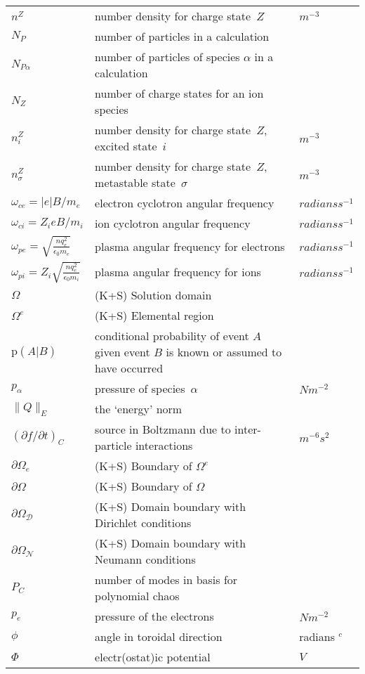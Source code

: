 \begin{longtable}{|p{3.0cm}|p{10.0cm}|p{3.0cm}|}
$n^Z$ & number density for charge state~$Z$  & $m^{-3}$ \\
$N_P$ & number of particles in a calculation & \\
$N_{P\alpha} $ & number of particles of species $\alpha$ in a calculation & \\
$N_Z$ & number of charge states for an ion species & \\
$n^Z_i$ & number density for charge state~$Z$, excited state~$i$  & $m^{-3}$ \\
$n^Z_\sigma$ & number density for charge state~$Z$, metastable state~$\sigma$  & $m^{-3}$ \\
$\omega_{ce}= |e|B/m_e$ & electron cyclotron angular frequency & $radians s^{-1}$ \\
$\omega_{ci}= Z_i e B/m_i$ & ion cyclotron angular frequency & $radians s^{-1}$ \\
$\omega_{pe}= \sqrt{\frac{nq_e^2}{\epsilon_0 m_e}}$ & plasma angular frequency for electrons & $radians s^{-1}$ \\
$\omega_{pi}= Z_i\sqrt{\frac{nq_e^2}{\epsilon_0 m_i}}$ & plasma angular frequency for ions & $radians s^{-1}$ \\
$\Omega$ &  (K+S) Solution domain & \\
$\Omega^e$ &  (K+S) Elemental region & \\
$\mathrm{p}(A|B)$ & conditional probability of event $A$ given event $B$ is known or assumed to have occurred  & \\
$p_\alpha$ & pressure of species~$\alpha$  & $N m^{-2}$ \\
$\parallel  Q \parallel_E $ &the `energy' norm  & \\
$(\partial f/\partial t)_C$ & source in Boltzmann due to inter-particle interactions  & $m^{-6} s^2$ \\
$\partial \Omega_e$ &  (K+S) Boundary of $\Omega^e$ & \\
$\partial \Omega$ &  (K+S) Boundary of $\Omega$ & \\
$\partial \Omega_{\mathcal D}$ &  (K+S) Domain boundary with Dirichlet conditions & \\
$\partial \Omega_{\mathcal N}$ &  (K+S) Domain boundary with Neumann conditions & \\
$P_C$ & number of modes in basis for polynomial chaos & \\
$p_e$ & pressure of the electrons  & $N m^{-2}$ \\
$\phi$ & angle in toroidal direction & radians $^c$ \\
$\Phi$ & electr(ostat)ic potential  & $V$ \\

\end{longtable}
